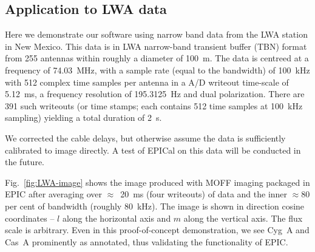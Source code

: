 \documentclass[a4paper,fleqn,usenatbib]{mnras}
\begin{document}
\subsection{Application to LWA data}\label{sec:LWA-data}

Here we demonstrate our software using narrow band data from the LWA station 
in New Mexico. This data is in LWA narrow-band transient buffer (TBN) format 
from 255 antennas within roughly a diameter of 100~m. The data is centreed at a 
frequency of 74.03~MHz, with a sample rate (equal to the bandwidth) of 100~kHz 
with 512 complex time samples per antenna in a A/D writeout time-scale of 
5.12~ms, a frequency resolution of 195.3125~Hz and dual polarization. There are 
391 such writeouts (or time stamps; each contains 512 time samples at 100~kHz 
sampling) yielding a total duration of 2~s. 

We corrected the cable delays, but otherwise assume the data is sufficiently 
calibrated to image directly. A test of EPICal on this data will be conducted 
in the future.

Fig.~\ref{fig:LWA-image} shows the image produced with MOFF imaging 
packaged in EPIC after averaging over $\approx$~20~ms (four writeouts) of data 
and the inner $\approx 80$ per cent of bandwidth (roughly 80~kHz). The image is 
shown in direction cosine coordinates -- $l$ along the horizontal axis and $m$ 
along the vertical axis. The flux scale is arbitrary. Even in this 
proof-of-concept demonstration, we see Cyg~A and Cas~A prominently as annotated, 
thus validating the functionality of EPIC.
\end{document}
